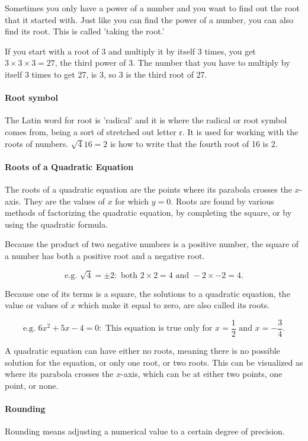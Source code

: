 \documentclass[12pt]{article}
\begin{document}
Sometimes you only have a power of a number and you want to find out the root that it started with. Just like you can find the power of a number, you can also find its root. This is called 'taking the root.'

If you start with a root of 3 and multiply it by itself 3 times, you get $3 \times 3 \times 3 = 27$, the third power of 3. The number that you have to multiply by itself 3 times to get 27, is 3, so 3 is the third root of 27.

\paragraph{Root symbol}
The Latin word for root is 'radical' and it is where the radical or root symbol \raisebox{.8ex}{$\sqrt{}$} comes from, being a sort of stretched out letter r. It is used for working with the roots of numbers. $\sqrt{4}{16}=2$ is how to write that the fourth root of 16 is 2.

\paragraph{Roots of a Quadratic Equation}
The roots of a quadratic equation are the points where its parabola crosses the $x$-axis. They are the values of \(x\) for which \(y = 0\). Roots are found by various methods of factorizing the quadratic equation, by completing the square, or by using the quadratic formula.

Because the product of two negative numbers is a positive number, the square of a number has both a positive root and a negative root.

$$\textrm{e.g. }\sqrt{4}=\pm2: \textrm{ both } 2\times2=4 \textrm{ and } -2\times-2=4.$$

Because one of its terms is a square, the solutions to a quadratic equation, the value or values of $x$ which make it equal to zero, are also called its roots.

$$\textrm{e.g. }6x^2+5x-4=0: \textrm{ This equation is true only for } x=\frac{1}{2} \textrm{ and } x=-\frac{3}{4}.$$

A quadratic equation can have either no roots, meaning there is no possible solution for the equation, or only one root, or two roots. This can be visualized as where its parabola crosses the $x$-axis, which can be at either two points, one point, or none.

\paragraph{Rounding}
Rounding means adjusting a numerical value to a certain degree of precision.
\end{document}
